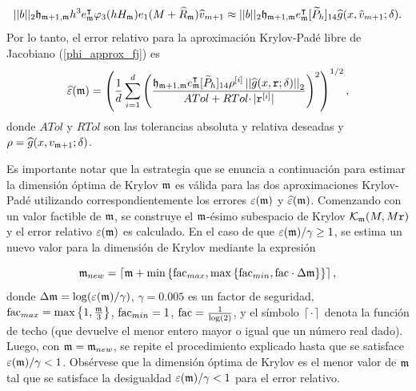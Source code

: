 \begin{equation*}
||b||_2 \mathfrak{h}_{\mathfrak{m}+1,\mathfrak{m}}h^3 e_{\mathfrak{m}}^\intercal\varphi_3(h H_{\mathfrak{m}})e_1(M+\widehat{R}_{\mathfrak{m}})\widehat{v}_{m+1} \approx ||b||_2 \mathfrak{h}_{\mathfrak{m}+1,\mathfrak{m}} e_{\mathfrak{m}}^\intercal[\widetilde{P}_{h}]_{14} \widehat{g}(x,\hat{v}_{m+1};\delta).
\end{equation*}
Por lo tanto, el error relativo para la aproximación Krylov-Padé libre de Jacobiano (\ref{phi_approx_fj}) es \cite{naranjo2023jacobian}
\begin{equation*}
	\widehat{\varepsilon}(\mathfrak{m}) = \left(\frac{1}{d}\sum\limits_{i=1}^{d} \left(\frac{
		\mathfrak{h}_{\mathfrak{m}+1,\mathfrak{m}} e_{\mathfrak{m}}^\intercal
		[\widetilde{P}_h]_{14} \rho^{[i]} \left\lvert \left\lvert \widehat{g}(x,\mathtt{r};\delta) \right\rvert \right\rvert_2}{ATol+ RTol\cdotp
		\rvert \mathtt{r}^{[i]}\rvert}\right)^{2}\right)^{1/2},
\end{equation*}
donde $ATol$ y $RTol$ son las tolerancias absoluta y relativa deseadas y $\rho = \widehat{g}(x,v_{\mathfrak{m}+1};\delta)$. 


 Es importante notar que la estrategia que se enuncia a continuación para estimar la dimensión óptima de Krylov $\mathfrak{m}$ es válida para las dos aproximaciones Krylov-Padé utilizando correspondientemente los errores $\varepsilon(\mathfrak{m})$ y $\widehat{\varepsilon}(\mathfrak{m})$.	Comenzando con un valor factible de $\mathfrak{m}$, se construye el $\mathfrak{m}$-ésimo subespacio de Krylov $\mathcal{K}_{\mathfrak{m}}(M,M\mathtt{r})$ y el error relativo $\varepsilon(\mathfrak{m})$ es calculado. En el caso de que $\varepsilon(\mathfrak{m})/\gamma \geq 1$, se estima un nuevo valor para la dimensión de Krylov mediante la expresión

\begin{equation} \label{eq:m-new}
\mathfrak{m}_{new} = \left\lceil \mathfrak{m} + \min\left\{ \mathrm{fac}_{max} , \max\left\{ \mathrm{fac}_{min},
		\mathrm{fac}\cdot\Delta\mathfrak{m} \right\}  \right\} \right\rceil,
\end{equation}
 \vspace{-0.1in}
\hspace{-0.26in} donde $\Delta\mathfrak{m}=\log(\varepsilon(\mathfrak{m})/\gamma)$, $\gamma=0.005$ es un factor de seguridad, $\mathrm{fac}_{max}= \max\left\{  1, \frac{\mathfrak{m}}{3}  \right\}$, $\mathrm{fac}_{min}= 1 $, $\mathrm{fac}=\frac{1}{\log(2)}$, y el símbolo $\left\lceil \cdot \right\rceil$ denota la función de techo (que devuelve el menor entero mayor o igual que un número real dado). Luego, con $\mathfrak{m}=\mathfrak{m}_{new}$, se repite el procedimiento explicado hasta que se satisface $\varepsilon(\mathfrak{m})/\gamma< 1$. Obsérvese que la dimensión óptima de Krylov es el menor valor de $\mathfrak{m}$ tal que se satisface la desigualdad  $\varepsilon(\mathfrak{m})/\gamma< 1$ para el error relativo.

